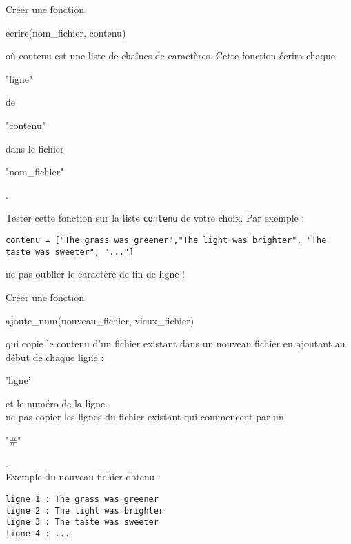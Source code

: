 \pagebreak
\exo

\begin{enonce}
	[Ecriture]

	\ques Créer une fonction \begin{texttt}ecrire(nom\_fichier, contenu)\end{texttt} où contenu est une liste de chaînes de caractères. Cette fonction écrira chaque \begin{texttt}"ligne"\end{texttt} de \begin{texttt}"contenu"\end{texttt} dans le fichier \begin{texttt}"nom\_fichier"\end{texttt}.

	Tester cette fonction sur la liste \texttt{contenu} de votre choix. Par exemple :\\

	\begin{verbatim}
contenu = ["The grass was greener","The light was brighter", "The taste was sweeter", "..."]

\end{verbatim}

	 ne pas oublier le caractère de fin de ligne !

	\ques Créer une fonction \begin{texttt}ajoute\_num(nouveau\_fichier, vieux\_fichier)\end{texttt} qui copie le contenu d'un fichier existant dans un nouveau fichier en ajoutant au début de chaque ligne : \begin{texttt}'ligne'\end{texttt} et le numéro de la ligne. \\

	 ne pas copier les lignes du fichier existant qui commencent par un \begin{texttt}"\#"\end{texttt}.\\

	Exemple du nouveau fichier obtenu :\\

	\begin{verbatim}
ligne 1 : The grass was greener
ligne 2 : The light was brighter
ligne 3 : The taste was sweeter
ligne 4 : ...
\end{verbatim}

\end{enonce}

